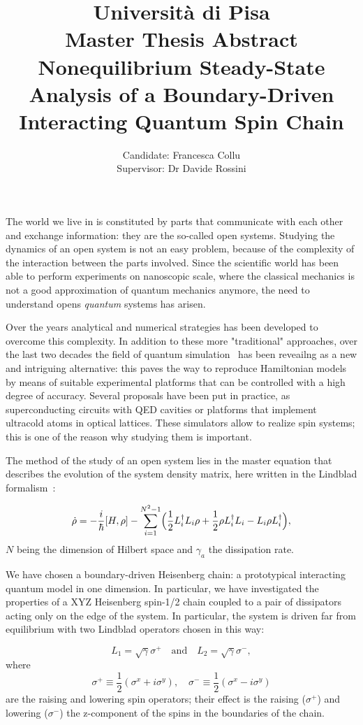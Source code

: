 \documentclass[12pt]{extarticle}
\title{{\normalsize{Università di Pisa}}\\{\normalsize{Master Thesis Abstract}}\\[1cm]\textbf{Nonequilibrium Steady-State Analysis of a Boundary-Driven Interacting Quantum Spin Chain}}
\author{Candidate: Francesca Collu\\{Supervisor: Dr Davide Rossini}}
\date{}
\begin{document}
\maketitle

The world we live in is constituted by parts that communicate with each other and exchange information: they are the so-called open systems. Studying the dynamics of an open system is not an easy problem, because of the complexity of the interaction between the parts involved. Since the scientific world has been able to perform experiments on nanoscopic scale, where the classical mechanics is not a good approximation of quantum mechanics anymore, the need to understand opens \emph{quantum} systems has arisen.

Over the years analytical and numerical strategies has been developed to overcome this complexity. In addition to these more "traditional" approaches, over the last two decades the field of quantum simulation~\cite{special_issue_nature} has been reveailng as a new and intriguing alternative: this paves the way to reproduce Hamiltonian models by means of suitable experimental platforms that can be controlled with a high degree of accuracy. Several proposals have been put in practice, as superconducting circuits with QED cavities or platforms that implement ultracold atoms in optical lattices. These simulators allow to realize spin systems; this is one of the reason why studying them is important.

The method of the study of an open system lies in the master equation that describes the evolution of the system density matrix, here written in the Lindblad formalism~\cite{pet_breuer:open_quantum}:

\begin{equation*}
    \dot{\rho} = -\frac{i}{\hbar}[H, \rho] - \sum_{i=1}^{N^2-1} \Bigl(\frac{1}{2}L_i^{\dagger}L_i\rho + \frac{1}{2}\rho L_i^{\dagger}L_i - L_i\rho L_i^{\dagger}\Bigl),
\end{equation*}
$N$ being the dimension of Hilbert space and $\gamma_a$ the dissipation rate.

We have chosen a boundary-driven Heisenberg chain: a prototypical interacting quantum model in one dimension. In particular, we have investigated the properties of a XYZ Heisenberg spin-1/2 chain coupled to a pair of dissipators acting only on the edge of the system. In particular, the system is driven far from equilibrium with two Lindblad operators chosen in this way:

\begin{equation*}
    L_1 = \sqrt{\gamma} \sigma^+ \quad \text{and} \quad L_2 =\sqrt{\gamma}\sigma^-,
\end{equation*}
where 
\begin{equation*}
    \sigma^+ \equiv \frac{1}{2}(\sigma^x + i\sigma^y), \quad \sigma^- \equiv \frac{1}{2}(\sigma^x - i\sigma^y)
\end{equation*}
are the raising and lowering spin operators; their effect is the raising ($\sigma^+$) and lowering ($\sigma^-$) the z-component of the spins in the boundaries of the chain.
\end{document}
